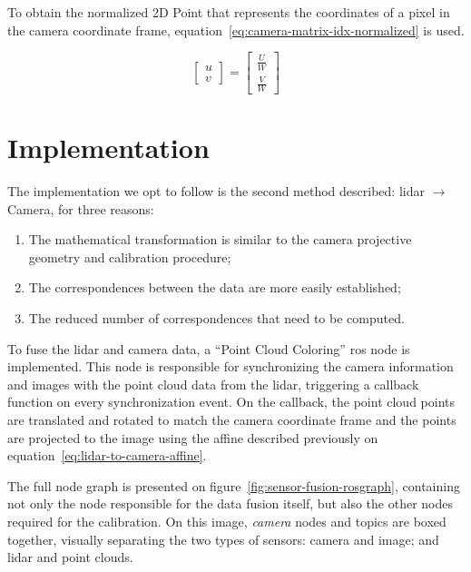 To obtain the normalized 2D Point that represents the coordinates of a pixel in the camera coordinate frame, equation~\ref{eq:camera-matrix-idx-normalized} is used.

\begin{equation}
	\renewcommand\arraystretch{1.5}
	\label{eq:camera-matrix-idx-normalized}
	\begin{bmatrix}
		u \\
		v
	\end{bmatrix}
	= 
	\begin{bmatrix}
		\frac{U}{W} \\
		\frac{V}{W}
	\end{bmatrix}
\end{equation}


\section{Implementation}
The implementation we opt to follow is the second method described: \ac{lidar}  $\rightarrow$ Camera, for three reasons:

\begin{enumerate}
	\item The mathematical transformation is similar to the camera projective geometry and calibration procedure;
	\item The correspondences between the data are more easily established;
	\item The reduced number of correspondences that need to be computed.
\end{enumerate}


To fuse the \ac{lidar} and camera data, a ``Point Cloud Coloring'' \ac{ros} node is implemented. This node is responsible for synchronizing the camera information and images with the point cloud data from the \ac{lidar}, triggering a callback function on every synchronization event. On the callback, the point cloud points are translated and rotated to match the camera coordinate frame and the points are projected to the image using the affine described previously on equation~\ref{eq:lidar-to-camera-affine}.

The full node graph is presented on figure~\ref{fig:sensor-fusion-rosgraph}, containing not only the node responsible for the data fusion itself, but also the other nodes required for the calibration. On this image, \emph{camera} nodes and topics are boxed together, visually separating the two types of sensors: camera and image; and \ac{lidar} and point clouds.

